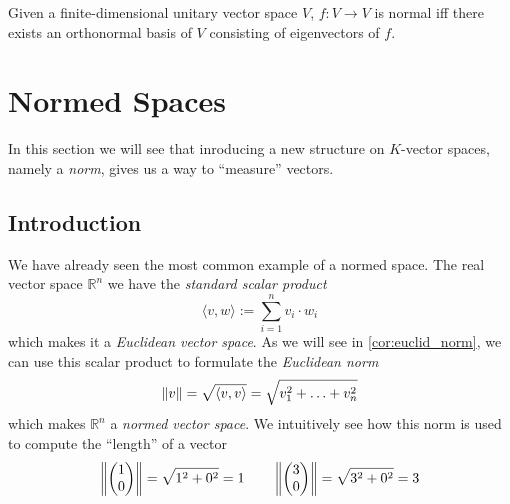 \begin{proposition}
   Given a finite-dimensional unitary vector space \(V\), \(f: V \to V\) is normal iff there exists an orthonormal basis of \(V\) consisting of eigenvectors of \(f\).
\end{proposition}

\section{Normed Spaces}
In this section we will see that inroducing a new structure on \(K\)-vector spaces, namely a \emph{norm}, gives us a way to ``measure'' vectors.

\subsection{Introduction}\label{ssec:normed_spaces_introduction}
We have already seen the most common example of a normed space.
The real vector space \(\mathbb{R}^n\) we have the \emph{standard scalar product}
\[\langle v, w \rangle := \sum_{i = 1}^n v_i \cdot w_i\]
which makes it a \emph{Euclidean vector space}.
As we will see in \cref{cor:euclid_norm}, we can use this scalar product to formulate the \emph{Euclidean norm}
\[\left\lVert v\right\rVert = \sqrt{\langle v, v\rangle} = \sqrt{v_1^2 + \ldots + v_n^2}\]
which makes \(\mathbb{R}^n\) a \emph{normed vector space}.
We intuitively see how this norm is used to compute the ``length'' of a vector
\[\left\lVert\begin{pmatrix}1\\0\end{pmatrix}\right\rVert = \sqrt{1^2 + 0^2} = 1 \qquad \left\lVert\begin{pmatrix}3\\0\end{pmatrix}\right\rVert = \sqrt{3^2 + 0^2} = 3\]

